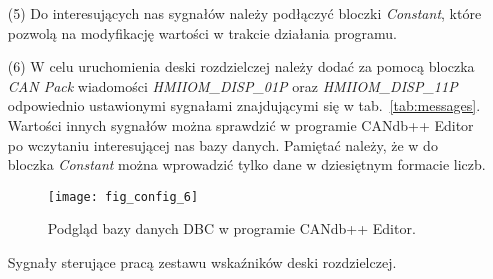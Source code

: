 \documentclass[11pt,onecolumn]{article}
\begin{document}
\begin{itemize}
%
\begin{figure}[!ht]
   \centering
   \texttt{[image: fig\_config\_3]}
   \caption{Parametry bloku \emph{CAN Pack}.}
   \label{fig:config_3}
\end{figure}
%
Po edycji bloczek \emph{CAN Pack} powinien wyglądać tak, jak na rys.~\ref{fig:config_4}. Po lewej stronie widać sygnały, a po prawej wyjście ramki CAN, które podłączamy do bloczka \emph{CAN Transmit}. Bloczek ten pozwala na wybranie urządzenia, na które ma zostać wysłana ramka. Dodatkowo posiada on możliwość transmitowania ramki cyklicznie. Doświadczalnie ustalono, że w celu poprawnego działania bloczek powinien transmitować cyklicznie wiadomości z okresem $0.01\,{\rm s}$ (zob. rys.~\ref{fig:config_5}).
%
\begin{figure}[!ht]
   \centering
   \texttt{[image: fig\_config\_4]}
   \caption{Wygenerowany bloczek \emph{CAN Pack}.}
   \label{fig:config_4}
\end{figure}
%
%
\begin{figure}[!ht]
   \centering
   \texttt{[image: fig\_config\_5]}
   \caption{Parametry bloku \emph{CAN Transmit}.}
   \label{fig:config_5}
\end{figure}
%
\item[(5)] Do interesujących nas sygnałów należy podłączyć bloczki \emph{Constant}, które pozwolą na modyfikację wartości w trakcie działania programu.
%
\item[(6)] W celu uruchomienia deski rozdzielczej należy dodać za pomocą bloczka \emph{CAN Pack} wiadomości \emph{HMIIOM\_DISP\_01P} oraz \emph{HMIIOM\_DISP\_11P} odpowiednio ustawionymi sygnałami znajdującymi się w tab.~\ref{tab:messages}. Wartości innych sygnałów można sprawdzić w programie CANdb++ Editor po wczytaniu interesującej nas bazy danych. Pamiętać należy, że w do bloczka \emph{Constant} można wprowadzić tylko dane w dziesiętnym formacie liczb.
%
\begin{figure}[!ht]
   \centering
   \texttt{[image: fig\_config\_6]}
   \caption{Podgląd bazy danych DBC w programie CANdb++ Editor.}
   \label{fig:config_6}
\end{figure}
%
%
\begin{table}[!ht]
\renewcommand{\arraystretch}{1.3}
\caption{Sygnały sterujące pracą zestawu wskaźników deski rozdzielczej.}

\end{table}
\end{itemize}
\end{document}
